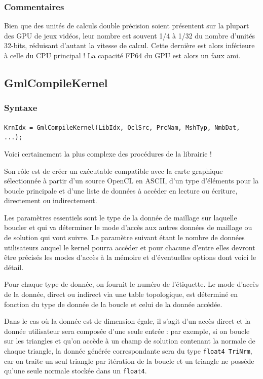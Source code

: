 \documentclass[a4paper,12pt]{article}
\begin{document}
\subsubsection*{Commentaires}
Bien que des unités de calculs double précision soient présentent sur la plupart des GPU de jeux vidéos, leur nombre est souvent 1/4 à 1/32 du nombre d'unités 32-bits, réduisant d'autant la vitesse de calcul.
Cette dernière est alors inférieure à celle du CPU principal !
La capacité FP64 du GPU est alors un faux ami.


\subsection{GmlCompileKernel}

\subsubsection*{Syntaxe}

{\tt KrnIdx = GmlCompileKernel(LibIdx, OclSrc, PrcNam, MshTyp, NmbDat, ...);}

Voici certainement la plus complexe des procédures de la librairie !

Son rôle est de créer un exécutable compatible avec la carte graphique sélectionnée à partir d'un source OpenCL en ASCII, d'un type d’éléments pour la boucle principale et d'une liste de données à accéder en lecture ou écriture, directement ou indirectement.

Les paramètres essentiels sont le type de la donnée de maillage sur laquelle boucler et qui va déterminer le mode d'accès aux autres données de maillage ou de solution qui vont suivre.
Le paramètre suivant étant le nombre de données utilisateurs auquel le kernel pourra accéder et pour chacune d'entre elles devront être précisés les modes d'accès à la mémoire et d'éventuelles options dont voici le détail.

Pour chaque type de donnée, on fournit le numéro de l'étiquette.
Le mode d'accès de la donnée, direct ou indirect via une table topologique, est déterminé en fonction du type de donnée de la boucle et celui de la donnée accédée.

Dans le cas où la donnée est de dimension égale, il s'agit d'un accès direct et la donnée utilisateur sera composée d'une seule entrée : par exemple, si on boucle sur les triangles et qu'on accède à un champ de solution contenant la normale de chaque triangle, la donnée générée correspondante sera du type {\tt float4 TriNrm}, car on traite un seul triangle par itération de la boucle et un triangle ne possède qu'une seule normale stockée dans un {\tt float4}.
\end{document}
